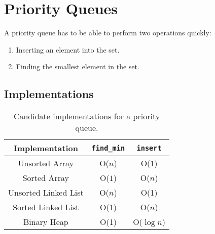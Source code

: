 \documentclass[11pt]{article}
\begin{document}
\section{Priority Queues}
\begin{tcolorbox}
A priority queue has to be able to perform two operations quickly:
\begin{enumerate}
    \item Inserting an element into the set.
    \item Finding the smallest element in the set.
\end{enumerate}
\end{tcolorbox}
\subsection{Implementations}
\begin{table}[H]
    \centering
    \begin{tabular}{c|c|c}
    \toprule
        Implementation & \texttt{find\_min} & \texttt{insert} \\ \midrule
        Unsorted Array & O($n$) & O($1$)  \\
        Sorted Array & O($1$) & O($n$) \\
        Unsorted Linked List & O($n$) & O(1) \\
        Sorted Linked List & O(1) & O($n$) \\
        Binary Heap & O(1) & O($\log n$) \\
    \bottomrule
    \end{tabular}
    \caption{Candidate implementations for a priority queue.}
    \label{tab:pq_implements}
\end{table}
\end{document}

